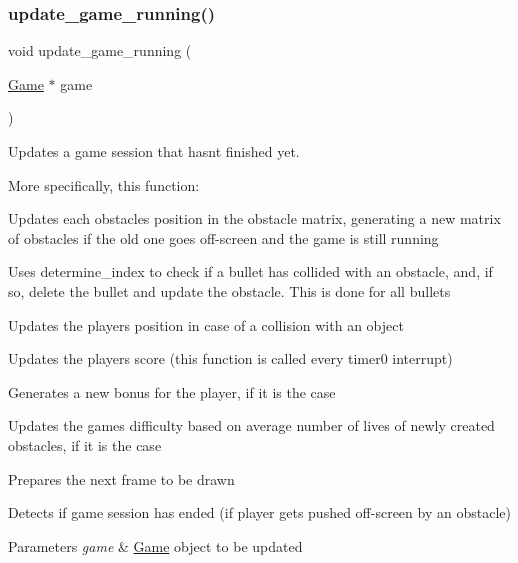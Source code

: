 \subsubsection{\texorpdfstring{update\+\_\+game\+\_\+running()}{update\_game\_running()}}
{\footnotesize\ttfamily void update\+\_\+game\+\_\+running (\begin{DoxyParamCaption}\item[{\hyperlink{struct_game}{Game} $\ast$}]{game }\end{DoxyParamCaption})}



Updates a game session that hasn\textquotesingle{}t finished yet. 

More specifically, this function\+:
\begin{DoxyItemize}
\item Updates each obstacle\textquotesingle{}s position in the obstacle matrix, generating a new matrix of obstacles if the old one goes off-\/screen and the game is still running
\item Uses determine\+\_\+index to check if a bullet has collided with an obstacle, and, if so, delete the bullet and update the obstacle. This is done for all bullets
\item Updates the player\textquotesingle{}s position in case of a collision with an object
\item Updates the player\textquotesingle{}s score (this function is called every timer0 interrupt)
\item Generates a new bonus for the player, if it is the case
\item Updates the game\textquotesingle{}s difficulty based on average number of lives of newly created obstacles, if it is the case
\item Prepares the next frame to be drawn
\item Detects if game session has ended (if player gets pushed off-\/screen by an obstacle)
\end{DoxyItemize}


\begin{DoxyParams}{Parameters}
{\em game} & \hyperlink{struct_game}{Game} \textquotesingle{}object\textquotesingle{} to be updated \\
\hline
\end{DoxyParams}
\hypertarget{group__game_ga7fb225326dc8e9874c6ae3ac8b92e590}{}\label{group__game_ga7fb225326dc8e9874c6ae3ac8b92e590} 
